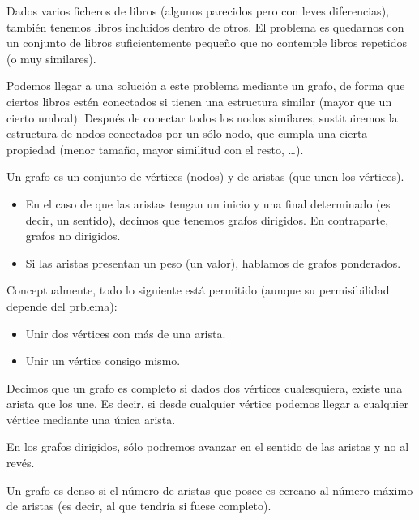 \begin{ejemplo}
    Dados varios ficheros de libros (algunos parecidos pero con leves diferencias), también tenemos libros incluidos dentro de otros. El problema es quedarnos con un conjunto de libros suficientemente pequeño que no contemple libros repetidos (o muy similares).

    Podemos llegar a una solución a este problema mediante un grafo, de forma que ciertos libros estén conectados si tienen una estructura similar (mayor que un cierto umbral). Después de conectar todos los nodos similares, sustituiremos la estructura de nodos conectados por un sólo nodo, que cumpla una cierta propiedad (menor tamaño, mayor similitud con el resto, \ldots).
\end{ejemplo}

\begin{definicion}[Grafo]
    Un grafo es un conjunto de vértices (nodos) y de aristas (que unen los vértices).
\end{definicion}
\begin{itemize}
    \item En el caso de que las aristas tengan un inicio y una final determinado (es decir, un sentido), decimos que tenemos grafos dirigidos. En contraparte, grafos no dirigidos.
    \item Si las aristas presentan un peso (un valor), hablamos de grafos ponderados.
\end{itemize}

Conceptualmente, todo lo siguiente está permitido (aunque su permisibilidad depende del prblema):
\begin{itemize}
    \item Unir dos vértices con más de una arista.
    \item Unir un vértice consigo mismo.
\end{itemize}

\begin{definicion}
    Decimos que un grafo es completo si dados dos vértices cualesquiera, existe una arista que los une. Es decir, si desde cualquier vértice podemos llegar a cualquier vértice mediante una única arista.
\end{definicion}
En los grafos dirigidos, sólo podremos avanzar en el sentido de las aristas y no al revés.

\begin{definicion}
    Un grafo es denso si el número de aristas que posee es cercano al número máximo de aristas (es decir, al que tendría si fuese completo).
\end{definicion}

